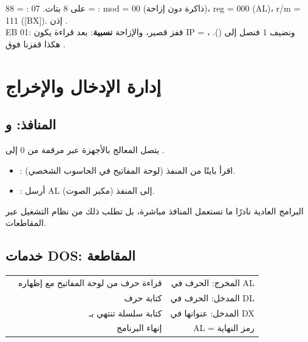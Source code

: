 \begin{mithal}
    \textenglish{88} = :  على 8 بتات. \textenglish{07} = :
    \textenglish{mod = 00} (ذاكرة دون إزاحة)، \textenglish{reg = 000} (\textenglish{AL})، \textenglish{r/m = 111} (\textenglish{[BX]}).
    إذن .\\[3pt]
    \textenglish{EB 01}: قفز قصير، والإزاحة \textbf{نسبية}: بعد قراءة  يكون \textenglish{IP = }،
    ونضيف 1 فنصل إلى  (). هكذا قفزنا فوق .
\end{mithal}

\section{إدارة الإدخال والإخراج}

\subsection{المنافذ:  و}
يتصل المعالج بالأجهزة عبر  مرقمة من 0 إلى .
\begin{itemize}
    \item {}: اقرأ بايتًا من المنفذ  (لوحة المفاتيح في الحاسوب الشخصي).
    \item {}: أرسل \textenglish{AL} إلى المنفذ  (مكبر الصوت).
\end{itemize}
البرامج العادية نادرًا ما تستعمل المنافذ مباشرة، بل تطلب ذلك من نظام التشغيل عبر المقاطعات.

\subsection{خدمات \textenglish{DOS}: المقاطعة }
\begin{center}
\small
\begin{tabularx}{\linewidth}{|c|R|R|}
    \hline
     &  &  \\ \hline
     & قراءة حرف من لوحة المفاتيح مع إظهاره & المخرج: الحرف في \textenglish{AL} \\ \hline
     & كتابة حرف & المدخل: الحرف في \textenglish{DL} \\ \hline
     & كتابة سلسلة تنتهي بـ\code{\$} & المدخل: عنوانها في \textenglish{DX} \\ \hline
     & إنهاء البرنامج & \textenglish{AL} = رمز النهاية \\ \hline
\end{tabularx}
\end{center}

